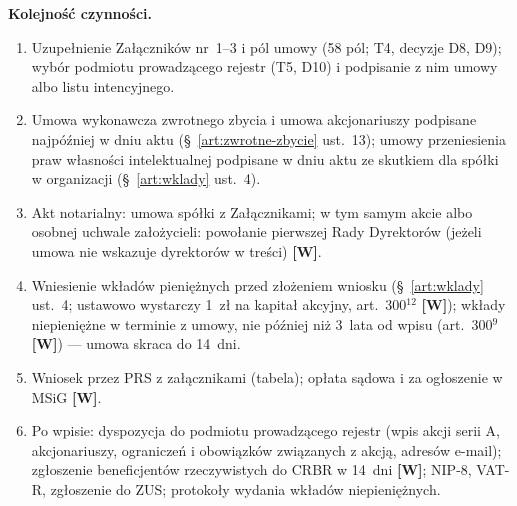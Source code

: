 \documentclass[12pt,a4paper]{report}
\newcommand{\Wiar}[1]{\textbf{[#1]}}
\begin{document}
\textbf{Kolejność czynności.}
\begin{enumerate}
  \item Uzupełnienie Załączników nr~1--3 i pól umowy (58 pól; T4, decyzje D8, D9); wybór podmiotu prowadzącego rejestr (T5, D10) i podpisanie z nim umowy albo listu intencyjnego.
  \item Umowa wykonawcza zwrotnego zbycia i umowa akcjonariuszy podpisane najpóźniej w dniu aktu (§~\ref{art:zwrotne-zbycie} ust.~13); umowy przeniesienia praw własności intelektualnej podpisane w dniu aktu ze skutkiem dla spółki w organizacji (§~\ref{art:wklady} ust.~4).
  \item Akt notarialny: umowa spółki z Załącznikami; w tym samym akcie albo osobnej uchwale założycieli: powołanie pierwszej Rady Dyrektorów (jeżeli umowa nie wskazuje dyrektorów w treści) \Wiar{W}.
  \item Wniesienie wkładów pieniężnych przed złożeniem wniosku (§~\ref{art:wklady} ust.~4; ustawowo wystarczy 1~zł na kapitał akcyjny, art.~300$^{12}$ \Wiar{W}); wkłady niepieniężne w terminie z umowy, nie później niż 3~lata od wpisu (art.~300$^{9}$ \Wiar{W}) --- umowa skraca do 14~dni.
  \item Wniosek przez PRS z załącznikami (tabela); opłata sądowa i za ogłoszenie w MSiG \Wiar{W}.
  \item Po wpisie: dyspozycja do podmiotu prowadzącego rejestr (wpis akcji serii A, akcjonariuszy, ograniczeń i obowiązków związanych z akcją, adresów e-mail); zgłoszenie beneficjentów rzeczywistych do CRBR w 14~dni \Wiar{W}; NIP-8, VAT-R, zgłoszenie do ZUS; protokoły wydania wkładów niepieniężnych.
\end{enumerate}
\end{document}
